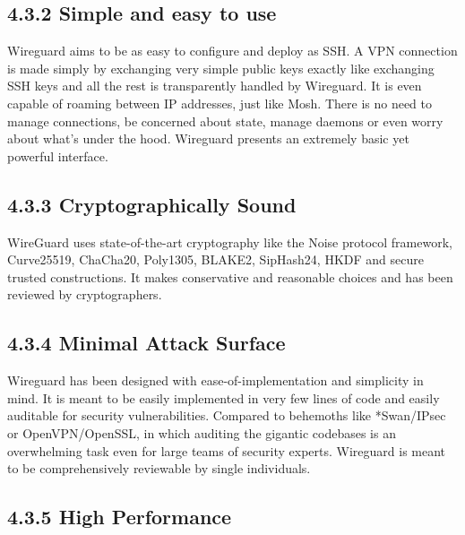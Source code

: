 \documentclass[12pt,a4paper,oneside]{report}
\begin{document}
\subsection{4.3.2 Simple and easy to use}

 Wireguard aims to be as easy to configure and deploy as SSH. A VPN connection is made simply by exchanging very simple public keys exactly like exchanging SSH keys and all the rest is transparently handled by Wireguard. It is even capable of roaming between IP addresses, just like Mosh. There is no need to manage connections, be concerned about state, manage daemons or even worry about what's under the hood. Wireguard presents an extremely basic yet powerful interface.




\subsection{4.3.3 Cryptographically Sound}

WireGuard uses state-of-the-art cryptography like the Noise protocol framework, Curve25519, ChaCha20, Poly1305, BLAKE2, SipHash24, HKDF and secure trusted constructions. It makes conservative and reasonable choices and has been reviewed by cryptographers.


\subsection{4.3.4 Minimal Attack Surface}

Wireguard has been designed with ease-of-implementation and simplicity in mind. It is meant to be easily implemented in very few lines of code and easily auditable for security vulnerabilities. Compared to behemoths like *Swan/IPsec or OpenVPN/OpenSSL, in which auditing the gigantic codebases is an overwhelming task even for large teams of security experts. Wireguard is meant to be comprehensively reviewable by single individuals.




\subsection{4.3.5 High Performance}
\end{document}
